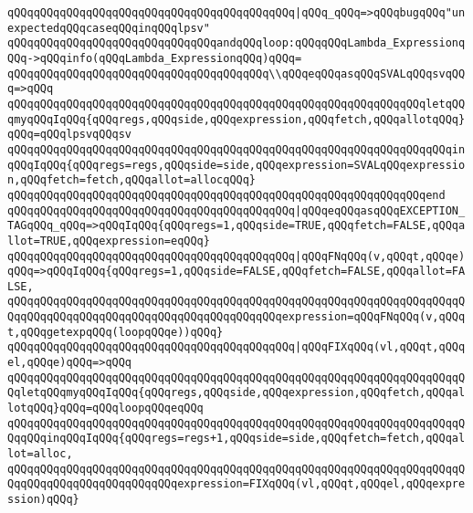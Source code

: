 \verb|qQQqqQQqqQQqqQQqqQQqqQQqqQQqqQQqqQQqqQQqqQQq|\verb#|qQQq_qQQq=>qQQqbugqQQq"unexpectedqQQqcaseqQQqinqQQqlpsv"#\newline
\newline
\verb|qQQqqQQqqQQqqQQqqQQqqQQqqQQqqQQqandqQQqloop:qQQqqQQqLambda_ExpressionqQQq->qQQqinfo(qQQqLambda_ExpressionqQQq)qQQq=|\newline
\verb|qQQqqQQqqQQqqQQqqQQqqQQqqQQqqQQqqQQqqQQq\\qQQqeqQQqasqQQqSVALqQQqsvqQQq=>qQQq|\newline
\verb|qQQqqQQqqQQqqQQqqQQqqQQqqQQqqQQqqQQqqQQqqQQqqQQqqQQqqQQqqQQqqQQqletqQQqmyqQQqIqQQq{qQQqregs,qQQqside,qQQqexpression,qQQqfetch,qQQqallotqQQq}qQQq=qQQqlpsvqQQqsv|\newline
\verb|qQQqqQQqqQQqqQQqqQQqqQQqqQQqqQQqqQQqqQQqqQQqqQQqqQQqqQQqqQQqqQQqqQQqinqQQqIqQQq{qQQqregs=regs,qQQqside=side,qQQqexpression=SVALqQQqexpression,qQQqfetch=fetch,qQQqallot=allocqQQq}|\newline
\verb|qQQqqQQqqQQqqQQqqQQqqQQqqQQqqQQqqQQqqQQqqQQqqQQqqQQqqQQqqQQqqQQqend|\newline
\verb|qQQqqQQqqQQqqQQqqQQqqQQqqQQqqQQqqQQqqQQqqQQq|\verb#|qQQqeqQQqasqQQqEXCEPTION_TAGqQQq_qQQq=>qQQqIqQQq{qQQqregs=1,qQQqside=TRUE,qQQqfetch=FALSE,qQQqallot=TRUE,qQQqexpression=eqQQq}#\newline
\newline
\verb|qQQqqQQqqQQqqQQqqQQqqQQqqQQqqQQqqQQqqQQqqQQq|\verb#|qQQqFNqQQq(v,qQQqt,qQQqe)qQQq=>qQQqIqQQq{qQQqregs=1,qQQqside=FALSE,qQQqfetch=FALSE,qQQqallot=FALSE,#\newline
\verb|qQQqqQQqqQQqqQQqqQQqqQQqqQQqqQQqqQQqqQQqqQQqqQQqqQQqqQQqqQQqqQQqqQQqqQQqqQQqqQQqqQQqqQQqqQQqqQQqqQQqqQQqqQQqqQQqexpression=qQQqFNqQQq(v,qQQqt,qQQqgetexpqQQq(loopqQQqe))qQQq}|\newline
\verb|qQQqqQQqqQQqqQQqqQQqqQQqqQQqqQQqqQQqqQQqqQQq|\verb#|qQQqFIXqQQq(vl,qQQqt,qQQqel,qQQqe)qQQq=>qQQq#\newline
\verb|qQQqqQQqqQQqqQQqqQQqqQQqqQQqqQQqqQQqqQQqqQQqqQQqqQQqqQQqqQQqqQQqqQQqqQQqletqQQqmyqQQqIqQQq{qQQqregs,qQQqside,qQQqexpression,qQQqfetch,qQQqallotqQQq}qQQq=qQQqloopqQQqeqQQq|\newline
\verb|qQQqqQQqqQQqqQQqqQQqqQQqqQQqqQQqqQQqqQQqqQQqqQQqqQQqqQQqqQQqqQQqqQQqqQQqqQQqinqQQqIqQQq{qQQqregs=regs+1,qQQqside=side,qQQqfetch=fetch,qQQqallot=alloc,|\newline
\verb|qQQqqQQqqQQqqQQqqQQqqQQqqQQqqQQqqQQqqQQqqQQqqQQqqQQqqQQqqQQqqQQqqQQqqQQqqQQqqQQqqQQqqQQqqQQqqQQqexpression=FIXqQQq(vl,qQQqt,qQQqel,qQQqexpression)qQQq}|\newline
